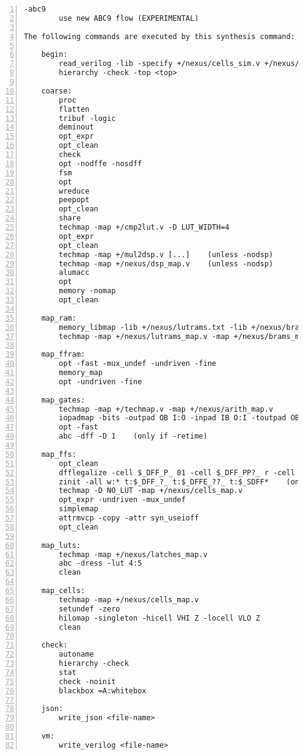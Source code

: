 \begin{lstlisting}[numbers=left,frame=single]
    -abc9
        use new ABC9 flow (EXPERIMENTAL)

The following commands are executed by this synthesis command:

    begin:
        read_verilog -lib -specify +/nexus/cells_sim.v +/nexus/cells_xtra.v
        hierarchy -check -top <top>

    coarse:
        proc
        flatten
        tribuf -logic
        deminout
        opt_expr
        opt_clean
        check
        opt -nodffe -nosdff
        fsm
        opt
        wreduce
        peepopt
        opt_clean
        share
        techmap -map +/cmp2lut.v -D LUT_WIDTH=4
        opt_expr
        opt_clean
        techmap -map +/mul2dsp.v [...]    (unless -nodsp)
        techmap -map +/nexus/dsp_map.v    (unless -nodsp)
        alumacc
        opt
        memory -nomap
        opt_clean

    map_ram:
        memory_libmap -lib +/nexus/lutrams.txt -lib +/nexus/brams.txt -lib +/nexus/lrams.txt -no-auto-huge [-no-auto-block] [-no-auto-distributed]    (-no-auto-block if -nobram, -no-auto-distributed if -nolutram)
        techmap -map +/nexus/lutrams_map.v -map +/nexus/brams_map.v -map +/nexus/lrams_map.v

    map_ffram:
        opt -fast -mux_undef -undriven -fine
        memory_map
        opt -undriven -fine

    map_gates:
        techmap -map +/techmap.v -map +/nexus/arith_map.v
        iopadmap -bits -outpad OB I:O -inpad IB O:I -toutpad OBZ ~T:I:O -tinoutpad BB ~T:O:I:B A:top    (skip if '-noiopad')
        opt -fast
        abc -dff -D 1    (only if -retime)

    map_ffs:
        opt_clean
        dfflegalize -cell $_DFF_P_ 01 -cell $_DFF_PP?_ r -cell $_SDFF_PP?_ r -cell $_DLATCH_?_ x [-cell $_DFFE_PP_ 01 -cell $_DFFE_PP?P_ r -cell $_SDFFE_PP?P_ r]    ($_*DFFE_* only if not -nodffe)
        zinit -all w:* t:$_DFF_?_ t:$_DFFE_??_ t:$_SDFF*    (only if -abc9 and -dff
        techmap -D NO_LUT -map +/nexus/cells_map.v
        opt_expr -undriven -mux_undef
        simplemap
        attrmvcp -copy -attr syn_useioff
        opt_clean

    map_luts:
        techmap -map +/nexus/latches_map.v
        abc -dress -lut 4:5
        clean

    map_cells:
        techmap -map +/nexus/cells_map.v
        setundef -zero
        hilomap -singleton -hicell VHI Z -locell VLO Z
        clean

    check:
        autoname
        hierarchy -check
        stat
        check -noinit
        blackbox =A:whitebox

    json:
        write_json <file-name>

    vm:
        write_verilog <file-name>
\end{lstlisting}

